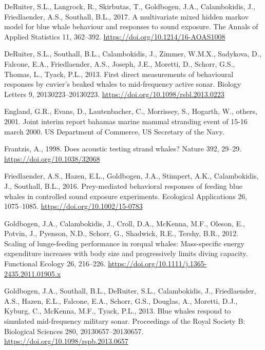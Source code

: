 \documentclass[]{elsarticle} %
\begin{document}
\hypertarget{ref-deruiter_multivariate_2017}{}
DeRuiter, S.L., Langrock, R., Skirbutas, T., Goldbogen, J.A.,
Calambokidis, J., Friedlaender, A.S., Southall, B.L., 2017. A
multivariate mixed hidden markov model for blue whale behaviour and
responses to sound exposure. The Annals of Applied Statistics 11,
362--392. \url{https://doi.org/10.1214/16-AOAS1008}

\hypertarget{ref-deruiter_first_2013}{}
DeRuiter, S.L., Southall, B.L., Calambokidis, J., Zimmer, W.M.X.,
Sadykova, D., Falcone, E.A., Friedlaender, A.S., Joseph, J.E., Moretti,
D., Schorr, G.S., Thomas, L., Tyack, P.L., 2013. First direct
measurements of behavioural responses by cuvier's beaked whales to
mid-frequency active sonar. Biology Letters 9, 20130223--20130223.
\url{https://doi.org/10.1098/rsbl.2013.0223}

\hypertarget{ref-england_joint_2001}{}
England, G.R., Evans, D., Lautenbacher, C., Morrissey, S., Hogarth, W.,
others, 2001. Joint interim report bahamas marine mammal stranding event
of 15-16 march 2000. US Department of Commerce, US Secretary of the
Navy.

\hypertarget{ref-frantzis_does_1998}{}
Frantzis, A., 1998. Does acoustic testing strand whales? Nature 392,
29--29. \url{https://doi.org/10.1038/32068}

\hypertarget{ref-friedlaender_prey-mediated_2016}{}
Friedlaender, A.S., Hazen, E.L., Goldbogen, J.A., Stimpert, A.K.,
Calambokidis, J., Southall, B.L., 2016. Prey-mediated behavioral
responses of feeding blue whales in controlled sound exposure
experiments. Ecological Applications 26, 1075--1085.
\url{https://doi.org/10.1002/15-0783}

\hypertarget{ref-goldbogen_scaling_2012}{}
Goldbogen, J.A., Calambokidis, J., Croll, D.A., McKenna, M.F., Oleson,
E., Potvin, J., Pyenson, N.D., Schorr, G., Shadwick, R.E., Tershy, B.R.,
2012. Scaling of lunge-feeding performance in rorqual whales:
Mass-specific energy expenditure increases with body size and
progressively limits diving capacity. Functional Ecology 26, 216--226.
\url{https://doi.org/10.1111/j.1365-2435.2011.01905.x}

\hypertarget{ref-goldbogen_blue_2013}{}
Goldbogen, J.A., Southall, B.L., DeRuiter, S.L., Calambokidis, J.,
Friedlaender, A.S., Hazen, E.L., Falcone, E.A., Schorr, G.S., Douglas,
A., Moretti, D.J., Kyburg, C., McKenna, M.F., Tyack, P.L., 2013. Blue
whales respond to simulated mid-frequency military sonar. Proceedings of
the Royal Society B: Biological Sciences 280, 20130657--20130657.
\url{https://doi.org/10.1098/rspb.2013.0657}
\end{document}
